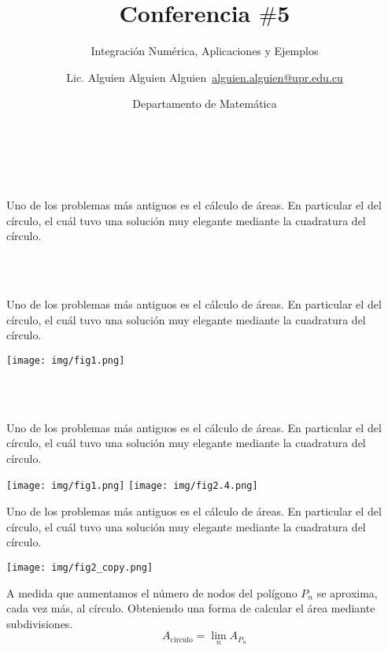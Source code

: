 \documentclass[xcolor=table, t]{beamer}
\title{Conferencia $\#$5}
\subtitle{Integración Numérica, Aplicaciones y Ejemplos}
\author{Lic. Alguien Alguien Alguien\ \hfill \href{mailto:alguien.alguien@upr.edu.cu}{alguien.alguien@upr.edu.cu}}
\date{Departamento de Matemática}
\begin{document}
	\begin{frame}
		\ \\ \ \\
		\begin{block}{}
			Uno de los problemas más antiguos es el cálculo de áreas. En particular el del círculo, el cuál tuvo una solución muy elegante mediante la cuadratura del círculo.
		\end{block}
	\end{frame}
	\begin{frame}
		\ \\ \ \\
		\begin{block}{}
			Uno de los problemas más antiguos es el cálculo de áreas. En particular el del círculo, el cuál tuvo una solución muy elegante mediante la cuadratura del círculo.
		\end{block}
		\begin{center}
			\texttt{[image: img/fig1.png]}
		\end{center}
	\end{frame}
	\begin{frame}
		\ \\ \ \\
		\begin{block}{}
			Uno de los problemas más antiguos es el cálculo de áreas. En particular el del círculo, el cuál tuvo una solución muy elegante mediante la cuadratura del círculo.
		\end{block}
		\begin{center}
			\texttt{[image: img/fig1.png]}
			\texttt{[image: img/fig2.4.png]}
		\end{center}
	\end{frame}
	\begin{frame}
		\begin{block}{}
			Uno de los problemas más antiguos es el cálculo de áreas. En particular el del círculo, el cuál tuvo una solución muy elegante mediante la cuadratura del círculo.
		\end{block}
		\begin{center}
			\texttt{[image: img/fig2\_copy.png]}
		\end{center}
		\pause
		\begin{block}{}
			A medida que aumentamos el número de nodos del polígono $P_n$ se aproxima, cada vez más, al círculo. Obteniendo una forma de calcular el área mediante subdivisiones.
			$$A_{\text{círculo}}=\lim_n A_{P_n} $$
		\end{block}
	\end{frame}
\end{document}
